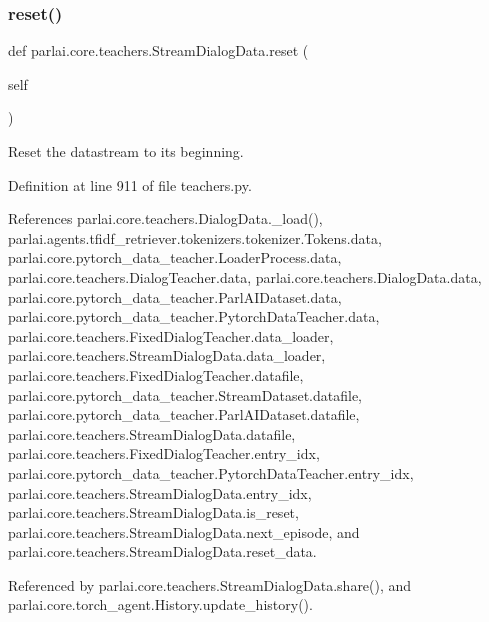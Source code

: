 \subsubsection{\texorpdfstring{reset()}{reset()}}
{\footnotesize\ttfamily def parlai.\+core.\+teachers.\+Stream\+Dialog\+Data.\+reset (\begin{DoxyParamCaption}\item[{}]{self }\end{DoxyParamCaption})}

\begin{DoxyVerb}Reset the datastream to its beginning.\end{DoxyVerb}
 

Definition at line 911 of file teachers.\+py.



References parlai.\+core.\+teachers.\+Dialog\+Data.\+\_\+load(), parlai.\+agents.\+tfidf\+\_\+retriever.\+tokenizers.\+tokenizer.\+Tokens.\+data, parlai.\+core.\+pytorch\+\_\+data\+\_\+teacher.\+Loader\+Process.\+data, parlai.\+core.\+teachers.\+Dialog\+Teacher.\+data, parlai.\+core.\+teachers.\+Dialog\+Data.\+data, parlai.\+core.\+pytorch\+\_\+data\+\_\+teacher.\+Parl\+A\+I\+Dataset.\+data, parlai.\+core.\+pytorch\+\_\+data\+\_\+teacher.\+Pytorch\+Data\+Teacher.\+data, parlai.\+core.\+teachers.\+Fixed\+Dialog\+Teacher.\+data\+\_\+loader, parlai.\+core.\+teachers.\+Stream\+Dialog\+Data.\+data\+\_\+loader, parlai.\+core.\+teachers.\+Fixed\+Dialog\+Teacher.\+datafile, parlai.\+core.\+pytorch\+\_\+data\+\_\+teacher.\+Stream\+Dataset.\+datafile, parlai.\+core.\+pytorch\+\_\+data\+\_\+teacher.\+Parl\+A\+I\+Dataset.\+datafile, parlai.\+core.\+teachers.\+Stream\+Dialog\+Data.\+datafile, parlai.\+core.\+teachers.\+Fixed\+Dialog\+Teacher.\+entry\+\_\+idx, parlai.\+core.\+pytorch\+\_\+data\+\_\+teacher.\+Pytorch\+Data\+Teacher.\+entry\+\_\+idx, parlai.\+core.\+teachers.\+Stream\+Dialog\+Data.\+entry\+\_\+idx, parlai.\+core.\+teachers.\+Stream\+Dialog\+Data.\+is\+\_\+reset, parlai.\+core.\+teachers.\+Stream\+Dialog\+Data.\+next\+\_\+episode, and parlai.\+core.\+teachers.\+Stream\+Dialog\+Data.\+reset\+\_\+data.



Referenced by parlai.\+core.\+teachers.\+Stream\+Dialog\+Data.\+share(), and parlai.\+core.\+torch\+\_\+agent.\+History.\+update\+\_\+history().

